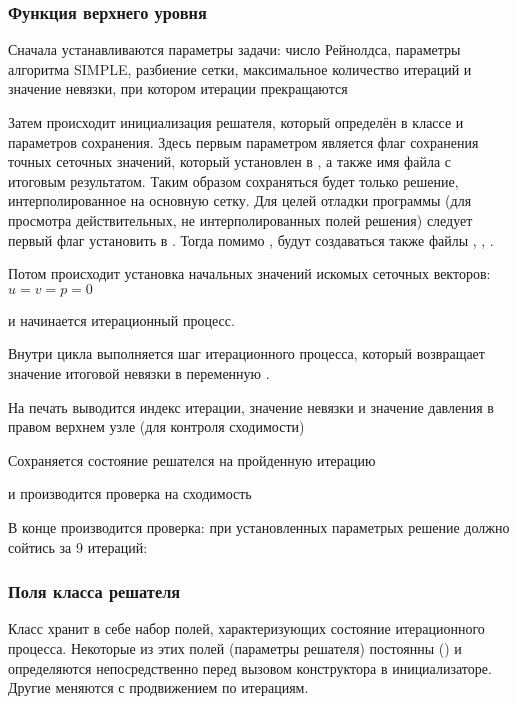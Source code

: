 \subsubsection{Функция верхнего уровня}

Сначала устанавливаются параметры задачи:
число Рейнолдса,
параметры алгоритма SIMPLE,
разбиение сетки, 
максимальное количество итераций 
и значение невязки, при котором итерации прекращаются

Затем происходит инициализация решателя, который
определён в классе 
и параметров сохранения. Здесь
первым параметром является флаг сохранения
точных сеточных значений, который установлен в ,
а также имя файла с итоговым результатом.
Таким образом сохраняться будет только решение,
интерполированное на основную сетку.
Для целей отладки программы (для просмотра действительных, не интерполированных полей решения)
следует первый флаг установить в . Тогда помимо , будут
создаваться также файлы , , .

Потом происходит установка начальных значений искомых сеточных векторов: $u=v=p=0$

и начинается итерационный процесс.

Внутри цикла
выполняется шаг итерационного процесса, который
возвращает значение итоговой невязки в переменную .

На печать выводится индекс итерации, значение невязки и значение давления в правом верхнем узле (для контроля сходимости)

Сохраняется состояние решателся на пройденную итерацию

и производится проверка на сходимость

В конце производится проверка: при установленных параметрых решение
должно сойтись за 9 итераций:

\subsubsection{Поля класса решателя}
Класс  хранит в себе набор полей,
характеризующих состояние итерационного процесса.
Некоторые из этих полей (параметры решателя) постоянны () и
определяются непосредственно перед вызовом конструктора в инициализаторе. Другие
меняются с продвижением по итерациям.

